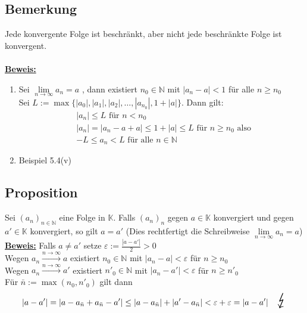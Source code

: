 \subsection{Bemerkung} %
\label{sub:bemerkung}
Jede konvergente Folge ist beschränkt, aber nicht jede beschränkte Folge ist konvergent. \\
\vspace{\baselineskip} \\
\underline{\textbf{Beweis:}} 
\begin{enumerate}[1.]
	\item Sei $\lim\limits_{n \to \infty} a_n = a$ , dann existiert $n_0 \in \mathds{N}$ mit $ |a_n -a| < 1$ für alle $n \geq n_0$ \\
	Sei $L := \max \big\{ |a_0|, |a_1|, |a_2|, \ldots , |a_{n_0}| , 1+ |a| \big\}$. Dann gilt:
	\begin{align*}
		&|a_n| \leq L \text{ für }n < n_0 \\
		&|a_n| = |a_n -a +a| \leq 1 + |a| \leq L \text{ für } n \geq n_0 \text{ also } \\
		&-L \leq a_n < L \text{ für alle } n \in \mathds{N} 
	\end{align*}
	\item Beispiel 5.4(v)
\end{enumerate}

\subsection{Proposition} %
\label{sub:proposition}
Sei $(a_n)_{n \in \mathds{N}}$ eine Folge in $\mathds{K}$. Falls $(a_n)_n$ gegen $a  \in \mathds{K}$ konvergiert und gegen $a' \in \mathds{K}$ 
konvergiert, so gilt $a=a'$ (Dies rechtfertigt die Schreibweise $\lim\limits_{n \to \infty} a_n = a$)
\vspace{\baselineskip} \\
\underline{\textbf{Beweis:}} Falls $a \not= a'$ setze $\varepsilon := \frac{|a-a'|}{2} > 0$ \\
Wegen $a_n \xrightarrow{n \to \infty} a$ existiert $n_0 \in \mathds{N}$ mit $|a_n -a| < \varepsilon $ für $n \geq n_0$ \\
Wegen $a_n \xrightarrow{n \to \infty} a'$ existiert $n'_0 \in \mathds{N}$ mit $|a_n -a'| < \varepsilon $ für $n \geq n'_0$
\vspace{\baselineskip} \\
Für $\bar n := \max (n_0, n'_0)$ gilt dann
\[
	|a - a'| = |a - a_{\bar n} + a_{\bar n} - a'| \leq |a- a_{\bar n}| + |a'- a_{\bar n}| < \varepsilon + \varepsilon = |a - a'| 
	\quad \text{\huge $\lightning$}
\]

